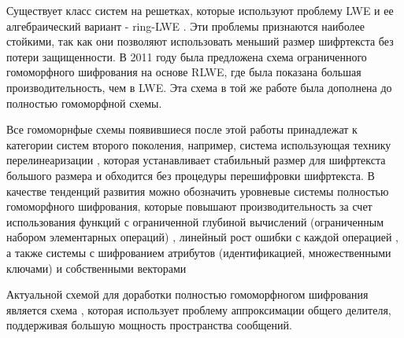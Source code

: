    \vspace{8mm}Существует класс систем на решетках, которые используют проблему LWE \cite{Regev-09} и ее алгебраический вариант - ring-LWE \cite{Lyubashevsky-13}. Эти проблемы признаются наиболее стойкими, так как они позволяют использовать меньший размер шифртекста без потери защищенности. В 2011 году была предложена схема ограниченного гомоморфного шифрования \cite{BrakevskiVaikuntanathan-11} на основе RLWE, где была показана большая производительность, чем в LWE. Эта схема в той же работе была дополнена до полностью гомоморфной схемы.\par
    Все гомоморнфые схемы появившиеся после этой работы принадлежат к категории систем второго поколения, например, система использующая технику перелинеаризации \cite{BrakevskiVaikuntanathan-14}, которая устанавливает стабильный размер для шифртекста большого размера и обходится без процедуры перешифровки шифртекста. В качестве тенденций развития можно обозначить уровневые системы полностью гомоморфного шифрования, которые повышают производительность за счет использования функций с ограниченной глубиной вычислений (ограниченным набором элементарных операций) \cite{Brakerski-14}, линейный рост ошибки с каждой операцией \cite{Peikert-15}, а также системы с шифрованием атрибутов (идентификацией, множественными ключами) и собственными векторами \cite{Gentry-13}\par
    Актуальной схемой для доработки полностью гомоморфногом шифрования является схема \cite{Cheon-16}, которая использует проблему аппроксимации общего делителя, поддерживая большую мощность пространства сообщений.\par

    \vspace{8mm}

    \vspace{8mm}

\normalcolor
